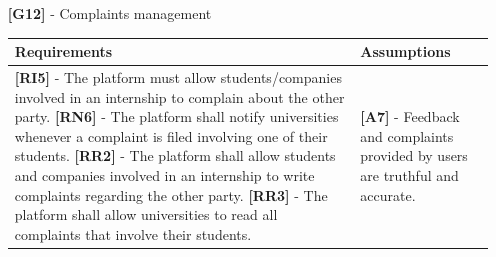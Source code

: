 \documentclass[11pt,twoside]{article}
\begin{document}
\begin{itemize}
\newpage
\item[\textbf{[G12]}] - Complaints management
\begin{table}[H]
\begin{tabular}{| p{} | p{} |}
\hline
\textbf{Requirements} & \textbf{Assumptions} \\
\hline
\textbf{[RI5]} - The platform must allow students/companies involved in an internship to complain about the other party. \newline
\textbf{[RN6]} - The platform shall notify universities whenever a complaint is filed involving one of their students. \newline
\textbf{[RR2]} - The platform shall allow students and companies involved in an internship to write complaints regarding the other party. \newline
\textbf{[RR3]} - The platform shall allow universities to read all complaints that involve their students.
& \textbf{[A7]} - Feedback and complaints provided by users are truthful and accurate. \\
\hline
\end{tabular}
\end{table}
\end{itemize}
\end{document}
